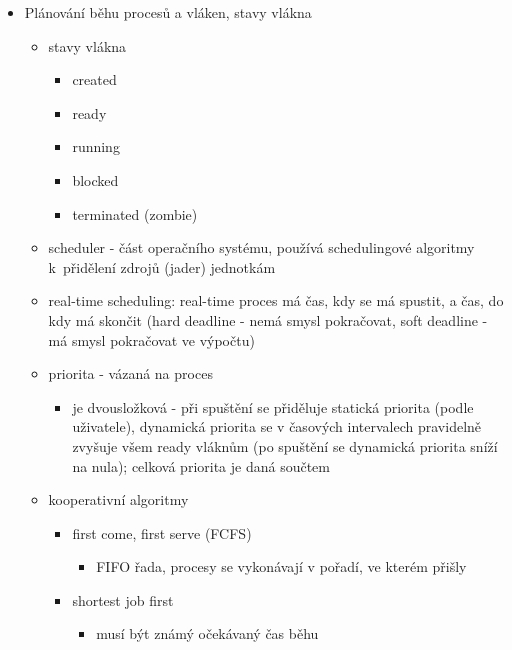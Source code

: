 \begin{itemize}
\begin{itemize}
\begin{itemize}
\end{itemize}
\item jinými slovy
\begin{itemize}
\item při kooperativním multitaskingu musí proces dobrovolně předat řízení (yield)
\item při preemptivním multitaskingu plánovač proces prostě přeruší, jakmile mu dojde čas
\end{itemize}
\end{itemize}
\item Plánování běhu procesů a vláken, stavy vlákna
\begin{itemize}
\item stavy vlákna
\begin{itemize}
\item created
\item ready
\item running
\item blocked
\item terminated (zombie)
\end{itemize}
\item scheduler - část operačního systému, používá schedulingové algoritmy k~přidělení zdrojů (jader) jednotkám
\item real-time scheduling: real-time proces má čas, kdy se má spustit, a čas, do kdy má skončit (hard deadline - nemá smysl pokračovat, soft deadline - má smysl pokračovat ve výpočtu)
\item priorita - vázaná na proces
\begin{itemize}
\item je dvousložková - při spuštění se přiděluje statická priorita (podle uživatele), dynamická priorita se v časových intervalech pravidelně zvyšuje všem ready vláknům (po spuštění se dynamická priorita sníží na nula); celková priorita je daná součtem
\end{itemize}
\item kooperativní algoritmy
\begin{itemize}
\item first come, first serve (FCFS)
\begin{itemize}
\item FIFO řada, procesy se vykonávají v pořadí, ve kterém přišly
\end{itemize}
\item shortest job first
\begin{itemize}
\item musí být známý očekávaný čas běhu

\end{itemize}
\end{itemize}
\end{itemize}
\end{itemize}
